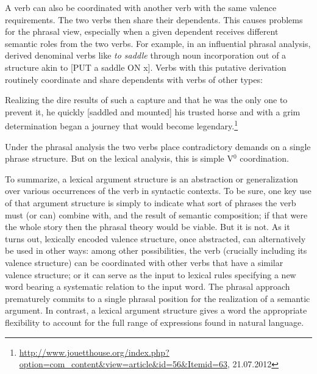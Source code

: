 \documentclass[output=paper
                ,modfonts
                ,nonflat
	        ,collection
	        ,collectionchapter
	        ,collectiontoclongg
 	        ,biblatex
                ,babelshorthands
                ,newtxmath
                ,draftmode
                ,colorlinks, citecolor=brown
]{./langsci/langscibook}
\begin{document}
A verb can also be coordinated with another verb with the same valence requirements.  The two verbs then share their dependents.  This causes problems for the phrasal view, especially when a given dependent receives different semantic roles from the two verbs.  For example, in an influential phrasal analysis, \citet{hale+keyser:1993}
derived denominal verbs like \textit{to saddle} through noun incorporation out of a structure akin to
[PUT a saddle ON x].  Verbs with this putative derivation routinely coordinate and share
dependents with verbs of other types: 

\begin{exe}
\ex Realizing the dire results of such a capture and that he was the only one to prevent it, he quickly
[saddled and mounted] his trusted horse and with a grim determination began a journey that would
become legendary.\footnote{\url{http://www.jouetthouse.org/index.php?option=com_content&view=article&id=56&Itemid=63},
  21.07.2012}  
\end{exe}

\noindent
Under the phrasal analysis the two verbs place contradictory demands on a single phrase structure.  But on the lexical analysis, this is simple V$^0$ coordination.   
 
To summarize, a lexical argument structure is an abstraction or generalization over various occurrences of the verb in syntactic contexts. To be sure, one key use of that argument structure is simply to indicate what sort of phrases the verb must (or can) combine with, and the result of semantic composition; if that were the whole story then the phrasal theory would be viable. But it is not. As it turns out, lexically encoded valence structure, once abstracted, can alternatively be used in other ways: among other possibilities, the verb (crucially including its valence structure) can be coordinated with other verbs that have a similar valence structure; or it can serve as the input to lexical rules specifying a new word bearing a systematic relation to the input word.   The phrasal approach prematurely commits to a single phrasal position for the realization of 
a semantic argument.  In contrast, a lexical argument structure gives a word the appropriate flexibility to account for the full range of expressions found in natural language.   
 


%
{\sloppy
\printbibliography[heading=subbibliography,notkeyword=this] 
}
\end{document}
